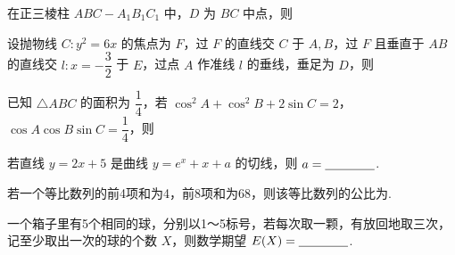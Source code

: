 \documentclass[a4paper,11pt]{report}
\begin{document}
\begin{examquestions}[start=9]
\item 在正三棱柱 $ABC-A_1B_1C_1$ 中，$D$ 为 $BC$ 中点，则
\item 设抛物线 $C:y^2=6x$ 的焦点为 $F$，过 $F$ 的直线交 $C$ 于 $A,B$，过 $F$ 且垂直于 $AB$ 的直线交 $l:x=-\dfrac32$ 于 $E$，过点 $A$ 作准线 $l$ 的垂线，垂足为 $D$，则
\newpage
\item 已知 $\triangle ABC$ 的面积为 $\dfrac14$，若 $\cos^2A+\cos^2B+2\sin C=2$，$\cos A\cos B\sin C=\dfrac14$，则
\end{examquestions}
\begin{examquestions}[start=12]
\item 若直线 $y=2x+5$ 是曲线 $y=e^x+x+a$ 的切线，则 $a=\underline{\hspace{1.4cm}}$. 
\item 若一个等比数列的前4项和为4，前8项和为68，则该等比数列的公比为\blank. 
\item 一个箱子里有5个相同的球，分别以1～5标号，若每次取一颗，有放回地取三次，记至少取出一次的球的个数 $X$，则数学期望 $E(X)=\underline{\hspace{1.4cm}}$. 
\end{examquestions}
\end{document}
